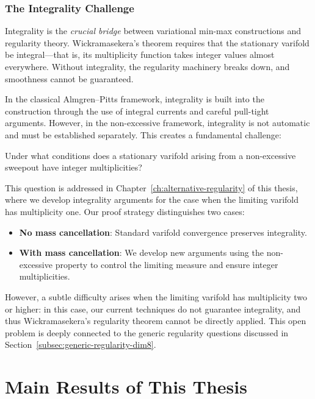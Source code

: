 \subsubsection{The Integrality Challenge}

Integrality is the \emph{crucial bridge} between variational min-max constructions and regularity
theory. Wickramasekera's theorem \cite{Wic14} requires that the stationary varifold be
integral---that is, its multiplicity function takes integer values almost everywhere. Without
integrality, the regularity machinery breaks down, and smoothness cannot be guaranteed.

In the classical Almgren--Pitts framework, integrality is built into the construction through the
use of integral currents and careful pull-tight arguments. However, in the non-excessive framework,
integrality is not automatic and must be established separately. This creates a fundamental
challenge:

\begin{question}
Under what conditions does a stationary varifold arising from a non-excessive sweepout have integer
multiplicities?
\end{question}

This question is addressed in Chapter~\ref{ch:alternative-regularity} of this thesis, where we develop
integrality arguments for the case when the limiting varifold has multiplicity one. Our proof
strategy distinguishes two cases:
\begin{itemize}
    \item \textbf{No mass cancellation}: Standard varifold convergence preserves integrality.

    \item \textbf{With mass cancellation}: We develop new arguments using the non-excessive property
    to control the limiting measure and ensure integer multiplicities.
\end{itemize}

However, a subtle difficulty arises when the limiting varifold has multiplicity two or higher: in
this case, our current techniques do not guarantee integrality, and thus Wickramasekera's regularity
theorem \cite{Wic14} cannot be directly applied. This open problem is deeply connected to the
generic regularity questions discussed in Section~\ref{subsec:generic-regularity-dim8}.

\section{Main Results of This Thesis}

